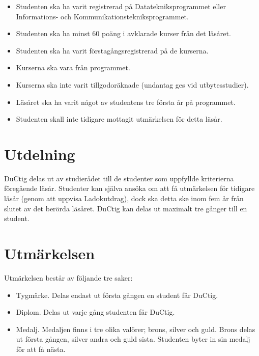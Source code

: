 \documentclass{dsekprotokoll}
\begin{document}
\begin{itemize}
	\item Studenten ska ha varit registrerad på Datatekniksprogrammet eller Informations- och
	      Kommunikationstekniksprogrammet.
	\item Studenten ska ha minst 60 poäng i avklarade kurser från det läsåret.
	\item Studenten ska ha varit förstagångsregistrerad på de kurserna.
	\item Kurserna ska vara från programmet.
	\item Kurserna ska inte varit tillgodoräknade (undantag ges vid utbytesstudier).
	\item Läsåret ska ha varit något av studentens tre första år på programmet.
	\item Studenten skall inte tidigare mottagit utmärkelsen för detta läsår.
\end{itemize}


\section{Utdelning}
DuCtig delas ut av studierådet till de studenter som uppfyllde kriterierna föregående läsår. Studenter kan själva ansöka om att få utmärkelsen för tidigare läsår (genom att uppvisa Ladokutdrag), dock ska detta ske inom fem år från slutet av det berörda läsåret. DuCtig kan delas ut
maximalt tre gånger till en student.

\section{Utmärkelsen}
Utmärkelsen består av följande tre saker:
\begin{itemize}
	\item Tygmärke. Delas endast ut första gången en student får DuCtig.
	\item Diplom. Delas ut varje gång studenten får DuCtig.
	\item Medalj. Medaljen finns i tre olika valörer; brons, silver och guld. Brons delas ut första
	      gången, silver andra och guld sista. Studenten byter in sin medalj för att få nästa.
\end{itemize}
\end{document}
